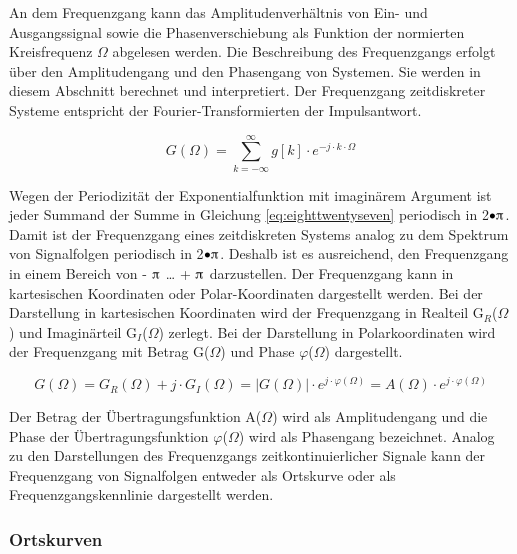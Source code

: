 \noindent An dem Frequenzgang kann das Amplitudenverh\"{a}ltnis von Ein- und Ausgangssignal sowie die Phasenverschiebung als Funktion der normierten Kreisfrequenz $\Omega$ abgelesen werden. Die Beschreibung des Frequenzgangs erfolgt \"{u}ber den Amplitudengang und den Phasengang von Systemen. Sie werden in diesem Abschnitt berechnet und interpretiert. Der Frequenzgang zeitdiskreter Systeme entspricht der Fourier-Transformierten der Impulsantwort.

\begin{equation}\label{eq:eighttwentyseven}
G\left(\Omega \right)=\sum _{k=-\infty }^{\infty }g\left[k\right]\cdot e^{-j\cdot k\cdot \Omega }
\end{equation}

\noindent Wegen der Periodizit\"{a}t der Exponentialfunktion mit imagin\"{a}rem Argument ist jeder Summand der Summe in Gleichung \eqref{eq:eighttwentyseven} periodisch in 2$\mathrm{\bullet}\piup$. Damit ist der Frequenzgang eines zeitdiskreten Systems analog zu dem Spektrum von Signalfolgen periodisch in 2$\mathrm{\bullet}\piup$. Deshalb ist es ausreichend, den Frequenzgang in einem Bereich von - $\piup$ {\dots} + $\piup$ darzustellen. Der Frequenzgang kann in kartesischen Koordinaten oder Polar-Koordinaten dargestellt werden. Bei der Darstellung in kartesischen Koordinaten wird der Frequenzgang in Realteil G${}_{R}$($\Omega$) und Imagin\"{a}rteil G${}_{I}$($\Omega$) zerlegt. Bei der Darstellung in Polarkoordinaten wird der Frequenzgang mit Betrag {\textbar}G($\Omega$){\textbar} und Phase $\varphi$($\Omega$) dargestellt.

\begin{equation}\label{eq:eighttwentyeight}
G\left(\Omega \right)=G_{R} \left(\Omega \right)+j\cdot G_{I} \left(\Omega \right)=\left|G\left(\Omega \right)\right|\cdot e^{j\cdot \varphi \left(\Omega \right)} =A\left(\Omega \right)\cdot e^{j\cdot \varphi \left(\Omega \right)}
\end{equation}

\noindent Der Betrag der \"{U}bertragungsfunktion A($\Omega$) wird als Amplitudengang und die Phase der \"{U}bertragungsfunktion $\varphi$($\Omega$) wird als Phasengang bezeichnet. Analog zu den Darstellungen des Frequenzgangs zeitkontinuierlicher Signale kann der Frequenzgang von Signalfolgen entweder als Ortskurve oder als Frequenzgangskennlinie dargestellt werden.

\subsubsection{Ortskurven}

